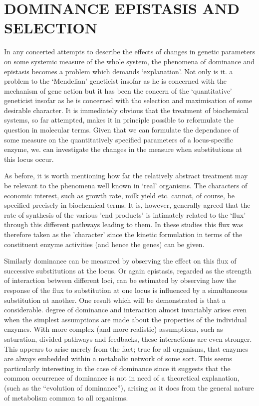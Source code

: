 

\chapter{DOMINANCE EPISTASIS AND SELECTION}

In any concerted attempts to describe the effects of changes in genetic parameters on some systemic measure of the whole system, the phenomena of dominance and epistasis becomes a problem which demands `explanation'. Not only is it. a problem to the `Mendelian' geneticist insofar as he is concerned with the mechanism of gene action but it has been the concern of the `quantitative' geneticist insofar as he is concerned with tho selection and maximisation of some desirable character. It is immediately obvious that the treatment of biochemical systems, so far attempted, makes it in principle possible to reformulate the question in molecular terms. Given that we can formulate the dependance of some measure on the quantitatively specified parameters of a locus-specific enzyme, we. can investigate the changes in the measure when substitutions at this locus occur.

As before, it is worth mentioning how far the relatively abstract treatment may be relevant to the phenomena well known in `real' organisms. The characters of economic interest, such as growth rate, milk yield etc. cannot, of course, be specified precisely in biochemical terms. It is, however, generally agreed that the rate of synthesis of the various 'end products' is intimately related to the `flux' through this different pathways leading to them. In these studies this flux was therefore taken as the 'character' since the kinetic formulation in terms of the constituent enzyme activities (and hence the genes) can be given.

Similarly dominance can be measured by observing the effect on this flux of successive substitutions at the locus. Or again epistasis, regarded as the strength of interaction between different loci, can be estimated by observing how the response of the flux to substitution at one locus is influenced by a simultaneous substitution at another. One result which will be demonstrated is that a considerable. degree of dominance and interaction almost invariably arises even when the simplest assumptions are made about the properties of the individual enzymes. With more complex (and more realistic) assumptions, such as saturation, divided pathways and feedbacks, these interactions are even stronger. This appears to arise merely from the fact; true for all organisms, that enzymes are always embedded within a metabolic network of some sort. This seems particularly interesting in the case of dominance since it suggests that the common occurrence of dominance is not in need of a theoretical explanation, (such as the ``evolution of dominance''), arising as it does from the general nature of metabolism common to all organisms.

